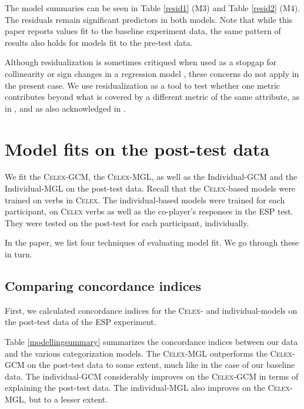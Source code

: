 \documentclass[12pt]{article}
\begin{document}
The model summaries can be seen in Table \ref{resid1} (M3) and Table \ref{resid2} (M4). The residuals remain significant predictors in both models. Note that while this paper reports values fit to the baseline experiment data, the same pattern of results also holds for models fit to the pre-test data.

Although residualization is sometimes critiqued when used as a stopgap for collinearity or sign changes in a regression model \citep{wurm2014residualizing}, these concerns do not apply in the present case.  We use residualization as a tool to test whether one metric contributes beyond what is covered by a different metric of the same attribute, as in 
\cite{baayen2006morphological}, and as also acknowledged in \cite{wurm2014residualizing}. 

\section{Model fits on the post-test data}\label{mglgcmposttest}

We fit the \textsc{Celex-GCM}, the \textsc{Celex-MGL}, as well as the Individual-GCM and the Individual-MGL on the post-test data. Recall that the \textsc{Celex}-based models were trained on verbs in \textsc{Celex}. The individual-based models were trained for each participant, on \textsc{Celex} verbs as well as the co-player's responses in the ESP test. They were tested on the post-test for each participant, individually.

In the paper, we list four techniques of evaluating model fit. We go through these in turn.

\subsection{Comparing concordance indices}

First, we calculated concordance indices for the \textsc{Celex}- and individual-models on the post-test data of the ESP experiment.


Table \ref{modellingsummary} summarizes the concordance indices between our data and the various categorization models. The \textsc{Celex}-MGL outperforms the \textsc{Celex}-GCM on the post-test data to some extent, much like in the case of our baseline data. The individual-GCM considerably improves on the \textsc{Celex}-GCM in terms of explaining the post-test data. The individual-MGL also improves on the \textsc{Celex}-MGL, but to a lesser extent.
\end{document}
